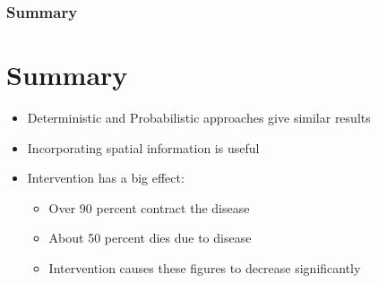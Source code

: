 \documentclass[30pt]{beamer}
\begin{document}
\begin{frame}
\frametitle{Summary}
\section{Summary}
\begin{itemize}
\item Deterministic and Probabilistic approaches give similar results
\item Incorporating spatial information is useful
\item Intervention has a big effect:
\begin{itemize}
\item Over 90 percent contract the disease
\item About 50 percent dies due to disease
\item Intervention causes these figures to decrease significantly 
\end{itemize}
\end{itemize}
\end{frame}
\end{document}
